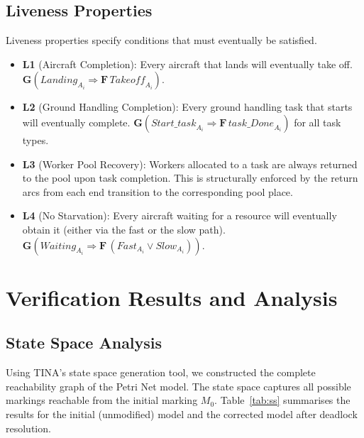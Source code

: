 \documentclass[conference,a4paper]{IEEEtran}
\begin{document}
\subsection{Liveness Properties}

Liveness properties specify conditions that must eventually be satisfied.

\begin{itemize}
  \item \textbf{L1} (Aircraft Completion): Every aircraft that lands will
    eventually take off.
    $\mathbf{G}(\mathit{Landing}_{A_i} \Rightarrow \mathbf{F}\,\mathit{Takeoff}_{A_i})$.
  \item \textbf{L2} (Ground Handling Completion): Every ground handling task
    that starts will eventually complete.
    $\mathbf{G}(\mathit{Start\_task}_{A_i} \Rightarrow
     \mathbf{F}\,\mathit{task\_Done}_{A_i})$ for all task types.
  \item \textbf{L3} (Worker Pool Recovery): Workers allocated to a task are
    always returned to the pool upon task completion. This is structurally
    enforced by the return arcs from each end transition to the corresponding
    pool place.
  \item \textbf{L4} (No Starvation): Every aircraft waiting for a resource
    will eventually obtain it (either via the fast or the slow path).
    $\mathbf{G}(\mathit{Waiting}_{A_i} \Rightarrow
     \mathbf{F}\,(\mathit{Fast}_{A_i} \vee \mathit{Slow}_{A_i}))$.
\end{itemize}

\section{Verification Results and Analysis}

\subsection{State Space Analysis}

Using TINA's state space generation tool, we constructed the complete
reachability graph of the Petri Net model. The state space captures all
possible markings reachable from the initial marking $M_0$. Table~\ref{tab:ss}
summarises the results for the initial (unmodified) model and the corrected
model after deadlock resolution.
\end{document}
